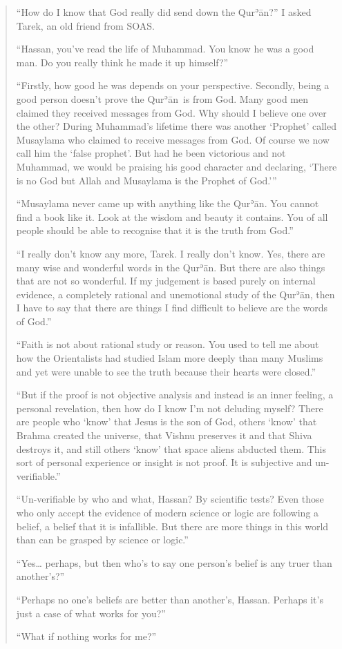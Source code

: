 \documentclass[12pt]{memoir}
\def\´{ʾ} %
\def \Quran{Qur\-\´ān} %
\begin{document}
\begin{quote}
“How do I know that God really did send down the \Quran?”
I asked Tarek, an old friend from SOAS.

“Hassan, you’ve read the life of Muhammad.
You know he was a good man.
Do you really think he made it up himself?”

“Firstly, how good he was depends on your perspective.
Secondly, being a good person doesn’t prove the \Quran\ is from God.
Many good men claimed they received messages from God.
Why should I believe one over the other?
During Muhammad’s lifetime there was another ‘Prophet’ called Musaylama
who claimed to receive messages from God.
Of course we now call him the ‘false prophet’.
But had he been victorious and not Muhammad,
we would be praising his good character and declaring,
‘There is no God but Allah and Musaylama is the Prophet of God.’”

“Musaylama never came up with anything like the \Quran.
You cannot find a book like it.
Look at the wisdom and beauty it contains.
You of all people should be able to recognise that it is the truth from God.”

“I really don’t know any more, Tarek.
I really don’t know.
Yes, there are many wise and wonderful words in the \Quran.
But there are also things that are not so wonderful.
If my judgement is based purely on internal evidence,
a completely rational and unemotional study of the \Quran,
then I have to say that there are things
I find difficult to believe are the words of God.”

“Faith is not about rational study or reason.
You used to tell me about how the Orientalists
had studied Islam more deeply than many Muslims
and yet were unable to see the truth because their hearts were closed.”

“But if the proof is not objective analysis and instead is an inner feeling,
a personal revelation, then how do I know I’m not deluding myself?
There are people who ‘know’ that Jesus is the son of God, others ‘know’
that Brahma created the universe, that Vishnu preserves it
and that Shiva destroys it, and still others ‘know’
that space aliens abducted them.
This sort of personal experience or insight is not proof.
It is subjective and un-verifiable.”

“Un-verifiable by who and what, Hassan? By scientific tests?
Even those who only accept the evidence of modern science or logic
are following a belief, a belief that it is infallible.
But there are more things in this world
than can be grasped by science or logic.”

“Yes… perhaps, but then who’s to say one person’s belief
is any truer than another’s?”

“Perhaps no one’s beliefs are better than another’s, Hassan.
Perhaps it’s just a case of what works for you?”

“What if nothing works for me?”
\end{quote}
\end{document}
